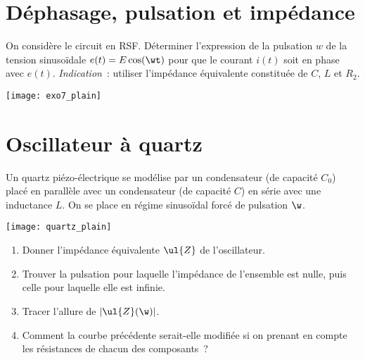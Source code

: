 \documentclass[a4paper, 12pt, final, garamond]{book}
\begin{document}
\section{Déphasage, pulsation et impédance}
\begin{minipage}{0.55\linewidth}
	On considère le circuit en RSF. Déterminer l'expression de la pulsation $w$
	de la tension sinusoïdale $e(t) = E\cos(\wt)$ pour que le courant $i(t)$
	soit en phase avec $e(t)$. \bigbreak
	\textit{Indication}~: utiliser l'impédance équivalente constituée de $C$,
	$L$ et $R_2$.
\end{minipage}
\hfill
\begin{minipage}{0.40\linewidth}
	\begin{center}
		\texttt{[image: exo7\_plain]}
	\end{center}
\end{minipage}

\section{Oscillateur à quartz}
\begin{minipage}{0.60\linewidth}
	Un quartz piézo-électrique se modélise par un condensateur (de capacité
	$C_0$) placé en parallèle avec un condensateur (de capacité $C$) en série
	avec une inductance $L$. On se place en régime sinusoïdal forcé de pulsation
	$\w$.
\end{minipage}
\hfill
\begin{minipage}{0.35\linewidth}
	\begin{center}
		\texttt{[image: quartz\_plain]}
	\end{center}
\end{minipage}

\begin{enumerate}
	\item Donner l'impédance équivalente $\ul{Z}$ de l'oscillateur.
	\item Trouver la pulsation pour laquelle l'impédance de l'ensemble est
	      nulle, puis celle pour laquelle elle est infinie.
	\item Tracer l'allure de $|\ul{Z}(\w)|$.
	\item Comment la courbe précédente serait-elle modifiée si on prenant en
	      compte les résistances de chacun des composants~?
\end{enumerate}
\end{document}
